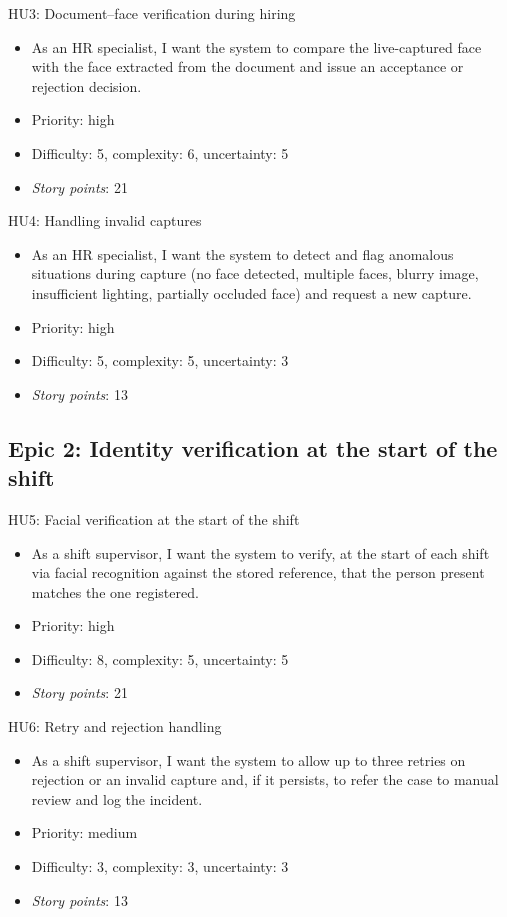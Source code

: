 \documentclass[
  11pt, %
]{charter}
\begin{document}
HU3: Document--face verification during hiring
\begin{itemize}
  \item As an HR specialist, I want the system to compare the live-captured face with the face extracted from the document and issue an acceptance or rejection decision.
  \item Priority: high
  \item Difficulty: 5, complexity: 6, uncertainty: 5
  \item \textit{Story points}: 21
\end{itemize}

HU4: Handling invalid captures
\begin{itemize}
  \item As an HR specialist, I want the system to detect and flag anomalous situations during capture (no face detected, multiple faces, blurry image, insufficient lighting, partially occluded face) and request a new capture.
  \item Priority: high
  \item Difficulty: 5, complexity: 5, uncertainty: 3
  \item \textit{Story points}: 13
\end{itemize}

\subsection{Epic 2: Identity verification at the start of the shift}

HU5: Facial verification at the start of the shift
\begin{itemize}
  \item As a shift supervisor, I want the system to verify, at the start of each shift via facial recognition against the stored reference, that the person present matches the one registered.
  \item Priority: high
  \item Difficulty: 8, complexity: 5, uncertainty: 5
  \item \textit{Story points}: 21
\end{itemize}

HU6: Retry and rejection handling
\begin{itemize}
  \item As a shift supervisor, I want the system to allow up to three retries on rejection or an invalid capture and, if it persists, to refer the case to manual review and log the incident.
  \item Priority: medium
  \item Difficulty: 3, complexity: 3, uncertainty: 3
  \item \textit{Story points}: 13
\end{itemize}
\end{document}
